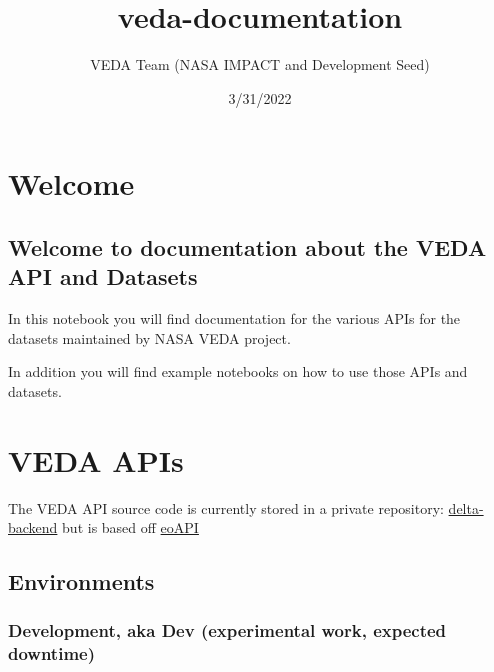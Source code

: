 \documentclass[
  letterpaper,
  DIV=11,
  numbers=noendperiod]{scrreprt}
\title{veda-documentation}
\author{VEDA Team (NASA IMPACT and Development Seed)}
\date{3/31/2022}
\renewcommand*\contentsname{Table of contents}
\begin{document}
\maketitle

\renewcommand*\contentsname{Table of contents}
{
\hypersetup{linkcolor=}
\setcounter{tocdepth}{2}
\tableofcontents
}
\hypertarget{welcome}{%
\chapter*{Welcome}\label{welcome}}

\hypertarget{welcome-to-documentation-about-the-veda-api-and-datasets}{%
\section*{Welcome to documentation about the VEDA API and
Datasets}\label{welcome-to-documentation-about-the-veda-api-and-datasets}}

In this notebook you will find documentation for the various APIs for
the datasets maintained by NASA VEDA project.

In addition you will find example notebooks on how to use those APIs and
datasets.

\hypertarget{veda-apis}{%
\chapter*{VEDA APIs}\label{veda-apis}}

The VEDA API source code is currently stored in a private repository:
\href{https://github.com/NASA-IMPACT/delta-backend}{delta-backend} but
is based off \href{https://github.com/developmentseed/eoAPI}{eoAPI}

\hypertarget{environments}{%
\section*{Environments}\label{environments}}

\hypertarget{development-aka-dev-experimental-work-expected-downtime}{%
\subsection*{Development, aka Dev (experimental work, expected
downtime)}\label{development-aka-dev-experimental-work-expected-downtime}}
\end{document}
